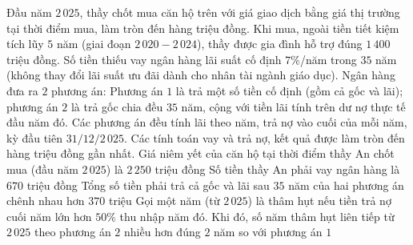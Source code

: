 \begin{ex}
	Đầu năm $2\,025$, thầy chốt mua căn hộ trên với giá giao dịch bằng giá thị trường tại thời điểm mua, làm tròn đến hàng triệu đồng. Khi mua, ngoài tiền tiết kiệm tích lũy $5$ năm (giai đoạn $2\,020-2\,024$), thầy được gia đình hỗ trợ đúng $1\,400$ triệu đồng. Số tiền thiếu vay ngân hàng lãi suất cố định $7\%$/năm trong $35$ năm (không thay đổi lãi suất ưu đãi dành cho nhân tài ngành giáo dục). Ngân hàng đưa ra $2$ phương án: Phương án $1$ là trả một số tiền cố định (gồm cả gốc và lãi); phương án $2$ là trả gốc chia đều $35$ năm, cộng với tiền lãi tính trên dư nợ thực tế đầu năm đó. Các phương án đều tính lãi theo năm, trả nợ vào cuối của mỗi năm, kỳ đầu tiên $31/12/2\,025$. Các tính toán vay và trả nợ, kết quả được làm tròn đến hàng triệu đồng gần nhất.
	\choiceTF
	{Giá niêm yết của căn hộ tại thời điểm thầy An chốt mua (đầu năm $2\,025$) là $2\,250$ triệu đồng}
	{Số tiền thầy An phải vay ngân hàng là $670$ triệu đồng}
	{\True Tổng số tiền phải trả cả gốc và lãi sau $35$ năm của hai phương án chênh nhau hơn $370$ triệu}
	{\True Gọi một năm (từ $2\,025$) là thâm hụt nếu tiền trả nợ cuối năm lớn hơn $50\%$ thu nhập năm đó. Khi đó, số năm thâm hụt liên tiếp từ $2\,025$ theo phương án $2$ nhiều hơn đúng $2$ năm so với phương án $1$}
\end{ex}
